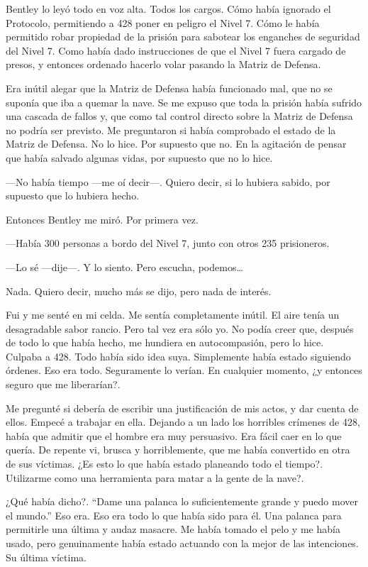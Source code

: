 Bentley lo leyó todo en voz alta. Todos los cargos. Cómo había ignorado
el Protocolo, permitiendo a 428 poner en peligro el Nivel 7. Cómo le
había permitido robar propiedad de la prisión para sabotear los
enganches de seguridad del Nivel 7. Como había dado instrucciones de que
el Nivel 7 fuera cargado de presos, y entonces ordenado hacerlo volar
pasando la Matriz de Defensa.

Era inútil alegar que la Matriz de Defensa había funcionado mal, que no
se suponía que iba a quemar la nave. Se me expuso que toda la prisión
había sufrido una cascada de fallos y, que como tal control directo
sobre la Matriz de Defensa no podría ser previsto. Me preguntaron si
había comprobado el estado de la Matriz de Defensa. No lo hice. Por
supuesto que no. En la agitación de pensar que había salvado algunas
vidas, por supuesto que no lo hice.

---No había tiempo ---me oí decir---. Quiero decir, si lo hubiera
sabido, por supuesto que lo hubiera hecho.

Entonces Bentley me miró. Por primera vez.

---Había 300 personas a bordo del Nivel 7, junto con otros 235
prisioneros.

---Lo sé ---dije---. Y lo siento. Pero escucha, podemos\ldots{}

Nada. Quiero decir, mucho más se dijo, pero nada de interés.

Fui y me senté en mi celda. Me sentía completamente inútil. El aire
tenía un desagradable sabor rancio. Pero tal vez era sólo yo. No podía
creer que, después de todo lo que había hecho, me hundiera en
autocompasión, pero lo hice. Culpaba a 428. Todo había sido idea suya.
Simplemente había estado siguiendo órdenes. Eso era todo. Seguramente lo
verían. En cualquier momento, ¿y entonces seguro que me liberarían?.

Me pregunté si debería de escribir una justificación de mis actos, y dar
cuenta de ellos. Empecé a trabajar en ella. Dejando a un lado los
horribles crímenes de 428, había que admitir que el hombre era muy
persuasivo. Era fácil caer en lo que quería. De repente vi, brusca y
horriblemente, que me había convertido en otra de sus víctimas. ¿Es esto
lo que había estado planeando todo el tiempo?. Utilizarme como una
herramienta para matar a la gente de la nave?.

¿Qué había dicho?. ``Dame una palanca lo suficientemente grande y puedo
mover el mundo.'' Eso era. Eso era todo lo que había sido para él. Una
palanca para permitirle una última y audaz masacre. Me había tomado el
pelo y me había usado, pero genuinamente había estado actuando con la
mejor de las intenciones. Su última víctima.

